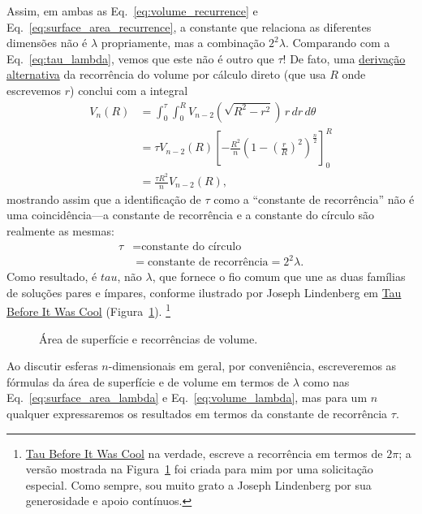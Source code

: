 Assim, em ambas as Eq.~\eqref{eq:volume_recurrence} e Eq.~\eqref{eq:surface_area_recurrence}, a constante que relaciona as diferentes dimensões não é $\lambda$ propriamente, mas a combinação $2^2\lambda$. Comparando com a Eq.~\eqref{eq:tau_lambda}, vemos que este não é outro que $\tau$! De fato, uma \href{https://en.wikipedia.org/wiki/Volume_of_an_n-ball#The_two-dimension_recursion_formula}{derivação alternativa} da recorrência do volume por cálculo direto (que usa $R$ onde escrevemos $r$) conclui com a integral
\begin{equation}
\label{eq:integral_recurrence}
\begin{split}
V_n(R) & = \int_0^\tau \int_0^R V_{n-2}\left(\sqrt{R^2 - r^2}\right) \,r\,dr\,d\theta \\
       & = \tau V_{n-2}(R) \left[-\frac{R^2}{n}\left(1 - \left(\frac{r}{R}\right)^2\right)^\frac{n}{2}\right]_{0}^{R} \\
       & = \frac{\tau R^2}{n} V_{n-2}(R),
\end{split}
\end{equation}
mostrando assim que a identificação de $\tau$ como a ``constante de recorrência'' não é uma coincidência---a constante de recorrência e a constante do círculo são realmente as mesmas:
\[
\begin{split}
\tau & = \mbox{constante do círculo} \\
     & = \mbox{constante de recorrência} = 2^2\lambda.
\end{split}
\]
Como resultado, é $tau$, não $\lambda$, que fornece o fio comum que une as duas famílias de soluções pares e ímpares, conforme ilustrado por Joseph Lindenberg em \href{http://sites.google.com/site/taubeforeitwascool/}{Tau Before It Was Cool} (Figura~\ref{fig:Nspheres}). \footnote{\href{http://sites.google.com/site/taubeforeitwascool/}{Tau Before It Was Cool} na verdade, escreve a recorrência em termos de $2\pi$; a versão mostrada na Figura~\ref{fig:Nspheres} foi criada para mim por uma solicitação especial. Como sempre, sou muito grato a Joseph Lindenberg por sua generosidade e apoio contínuos.}

\begin{figure}
\begin{center}
\end{center}
\caption{Área de superfície e recorrências de volume.\label{fig:Nspheres}}
\end{figure}

Ao discutir esferas $n$-dimensionais em geral, por conveniência, \linebreak escreveremos as fórmulas da área de superfície e de volume em termos de $\lambda$ como nas Eq.~\eqref{eq:surface_area_lambda} e Eq.~\eqref{eq:volume_lambda}, mas para um $n$ qualquer expressaremos os resultados em termos da constante de recorrência $\tau$.

